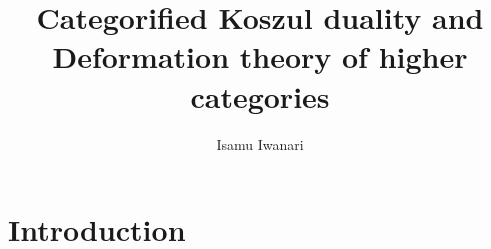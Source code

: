 \documentclass[leqno,12pt]{amsart}
\theoremstyle{plain}
\theoremstyle{definition}
\begin{document}
\title{Categorified Koszul duality and Deformation theory of higher categories}

\author{Isamu Iwanari}




\maketitle



\setcounter{tocdepth}{1}
\tableofcontents



\section{Introduction}
\end{document}
